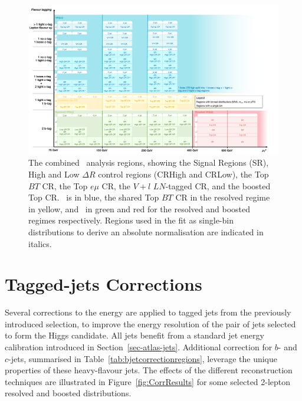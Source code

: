 \newpage

\begin{figure}
    \centering
    \includegraphics[width=\textwidth]{Images/VH/Cat/VH_analysis_catCorr.png}
    \caption{The combined \vhbc\ analysis regions, showing the Signal Regions (SR), High and Low $\Delta R$ control regions (CRHigh and CRLow), the Top $BT$ CR, the Top $e\mu$ CR, the $V+l$ $LN$-tagged CR, and the boosted Top CR. \vhc\ is in blue, the shared Top $BT$ CR in the resolved regime in yellow, and \vhb\ in green and red for the resolved and boosted regimes respectively. Regions used in the fit as single-bin distributions to derive an absolute normalisation are indicated in italics. } 
    \label{fig:ana-strat-det}
\end{figure} 

\clearpage

\section{Tagged-jets Corrections}\label{sec-vh-jetcor}
Several corrections to the energy are applied to tagged jets from the previously introduced selection, to improve the energy resolution of the pair of jets selected to form the Higgs candidate. All jets benefit from a standard jet energy calibration introduced in Section~\ref{sec-atlas-jets}. Additional correction for $b$- and $c$-jets, summarised in Table~\ref{tab:bjetcorrectionregions}, leverage the unique properties of these heavy-flavour jets. The effects of the different reconstruction techniques are illustrated in Figure~\ref{fig:CorrResults} for some selected 2-lepton resolved and boosted distributions. 

